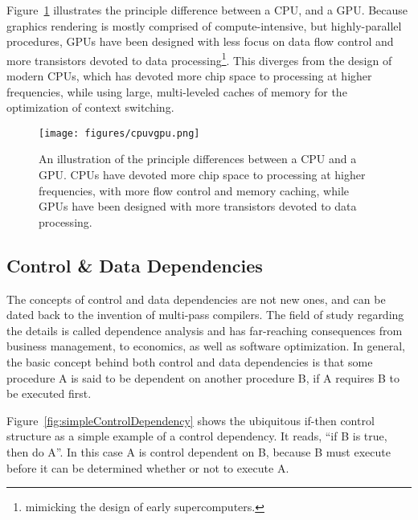 Figure~\ref{fig:cpuvgpu} illustrates the principle difference between a \gls{CPU}, and a GPU. Because graphics rendering is mostly comprised of compute-intensive, but highly-parallel procedures, \glspl{GPU} have been designed with less focus on data flow control and more transistors devoted to data processing\footnote{mimicking the design of early supercomputers.}. This diverges from the design of modern CPUs, which has devoted more chip space to processing at higher frequencies, while using large, multi-leveled caches of memory for the optimization of context switching.

\begin{figure}[ht]
\ffigbox
	{\texttt{[image: figures/cpuvgpu.png]}}%
	{\caption[CPU vs GPU Construction]{An illustration of the principle differences between a CPU and a GPU. CPUs have devoted more chip space to processing at higher frequencies, with more flow control and memory caching, while GPUs have been designed with more transistors devoted to data processing.}\label{fig:cpuvgpu}}
\end{figure}

%
%
%
%
\subsection{Control \& Data Dependencies}
\label{ch2sPPssCDD}

The concepts of control and data dependencies are not new ones, and can be dated back to the invention of multi-pass compilers. The field of study regarding the details is called dependence analysis and has far-reaching consequences from business management, to economics, as well as software optimization. In general, the basic concept behind both control and data dependencies is that some procedure A is said to be dependent on another procedure B, if A requires B to be executed first.

Figure~\ref{fig:simpleControlDependency} shows the ubiquitous if-then control structure as a simple example of a control dependency. It reads, ``if B is true, then do A''. In this case A is control dependent on B, because B must execute before it can be determined whether or not to execute A.

